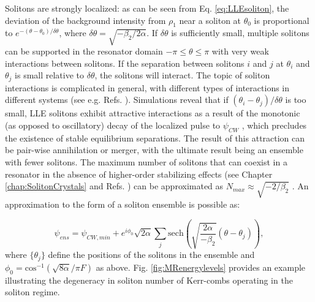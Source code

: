 
Solitons are strongly localized: as can be seen from Eq. \ref{eq:LLEsoliton}, the deviation of the background intensity from $\rho_1$ near a soliton at $\theta_0$ is proportional to $e^{-(\theta-\theta_0)/\delta\theta}$, where $\delta\theta=\sqrt{-\beta_2/2\alpha}$. If $\delta\theta$ is sufficiently small, multiple solitons can be supported in the resonator domain $-\pi\leq\theta\leq\pi$ with very weak interactions between solitons. If the separation between solitons $i$ and $j$ at $\theta_i$ and $\theta_j$ is small relative to $\delta\theta$, the solitons will interact. The topic of soliton interactions is complicated in general, with different types of interactions in different systems (see e.g. Refs. \cite{Zabusky1965,Gordon1983,Malomed1991,Jang2013}). Simulations reveal that if $(\theta_i-\theta_j)/\delta\theta$ is too small, LLE solitons exhibit attractive interactions as a result of the monotonic (as opposed to oscillatory) decay of the localized pulse to $\psi_{CW}$ \cite{Parra-Rivas2017}, which precludes the existence of stable equilibrium separations. The result of this attraction can be pair-wise annihilation or merger, with the ultimate result being an ensemble with fewer solitons. The maximum number of solitons that can coexist in a resonator in the absence of higher-order stabilizing effects (see Chapter \ref{chap:SolitonCrystals} and Refs. \cite{Wang2017,Parra-Rivas2017}) can be approximated as $N_{max}\approx\sqrt{-2/\beta_2}$ \cite{Herr2014}. An approximation to the form of a soliton ensemble is possible as:

\begin{equation}
\psi_{ens}=\psi_{CW,min}+e^{i\phi_0}\sqrt{2\alpha}\sum_j \mathrm{sech}\left(\sqrt{\frac{2\alpha}{-\beta_2}}(\theta-\theta_j)\right),\label{eq:LLEsolens}
\end{equation}
where $\{\theta_j\}$ define the positions of the solitons in the ensemble and $\phi_0=\mathrm{cos}^{-1}(\sqrt{8\alpha}/\pi F)$ as above. Fig. \ref{fig:MRenergylevels} provides an example illustrating the degeneracy in soliton number of Kerr-combs operating in the soliton regime.

